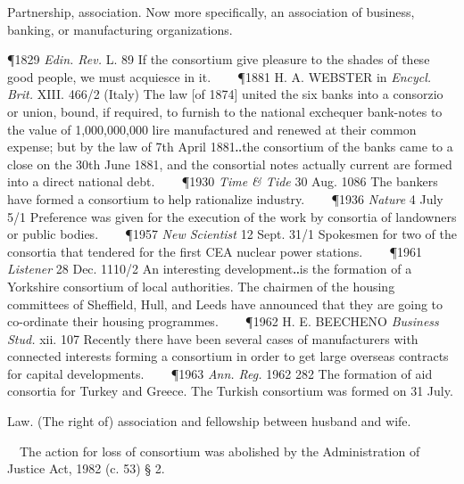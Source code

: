\begin{description}[wide, labelwidth=!, labelindent=0pt]
\vspace{-0.3cm}

\begin{myenumerate}

 Partnership, association. Now more specifically, an association of business, banking, or manufacturing organizations.

\P 1829  \textit{Edin. Rev.} L. 89 If the consortium give pleasure to the shades of these good people, we must acquiesce in it.    
\P 1881 H. A. WEBSTER in \textit{Encycl. Brit.} XIII. 466/2 (Italy) The law [of 1874] united the six banks into a consorzio or union, bound, if required, to furnish to the national exchequer bank-notes to the value of 1,000,000,000 lire manufactured and renewed at their common expense; but by the law of 7th April 1881‥the consortium of the banks came to a close on the 30th June 1881, and the consortial notes actually current are formed into a direct national debt.    
\P 1930 \textit{Time \& Tide}  30 Aug. 1086 The  bankers have formed a consortium to help rationalize industry.    
\P 1936  \textit{Nature} 4 July 5/1 Preference was given for the execution of the work by consortia of landowners or public bodies.    
\P 1957  \textit{New Scientist} 12 Sept. 31/1 Spokesmen for two of the consortia that tendered for the first CEA nuclear power stations.    
\P 1961  \textit{Listener} 28 Dec. 1110/2 An interesting development‥is the formation of a Yorkshire consortium of local authorities. The chairmen of the housing committees of Sheffield, Hull, and Leeds have announced that they are going to co-ordinate their housing programmes.    
\P 1962 H. E. BEECHENO  \textit{Business Stud.} xii. 107 Recently there have been several cases of manufacturers with connected interests forming a consortium in order to get large overseas contracts for capital developments.    
\P 1963  \textit{Ann. Reg.} 1962 282  The formation of aid consortia for Turkey and Greece. The Turkish consortium was formed on 31 July.

 Law. (The right of) association and fellowship between husband and wife.

  The action for loss of consortium was abolished by the Administration of Justice Act, 1982 (c. 53) § 2. 


\end{myenumerate}
\end{description}
